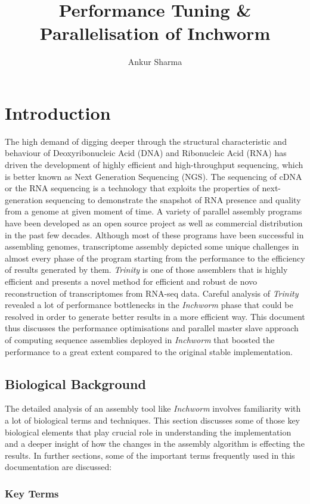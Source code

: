 \documentclass[plainarticle,zihtitle,english,final,hyperref,utf8]{zihpub}
\author{Ankur Sharma}
\title{Performance Tuning \& Parallelisation of Inchworm}
\begin{document}
\listoffigures
\newpage
\section{Introduction} 
The high demand of digging deeper through the structural characteristic and behaviour of Deoxyribonucleic Acid (DNA) and Ribonucleic Acid (RNA) has driven the development of highly efficient and high-throughput sequencing, which is better known as Next Generation Sequencing (NGS). The sequencing of cDNA or the RNA sequencing is a technology that exploits the properties of next-generation sequencing to demonstrate the snapshot of RNA presence and quality from a genome at given moment of time. A variety of parallel assembly programs have been developed as an open source project as well as commercial distribution in the past few decades. Although most of these programs have been successful in assembling genomes, transcriptome assembly depicted some unique challenges in almost every phase of the program starting from the performance to the efficiency of results generated by them. \emph{Trinity} is one of those assemblers that is highly efficient and presents a novel method for efficient and robust de novo reconstruction of transcriptomes from RNA-seq data. Careful analysis of \emph{Trinity} revealed a lot of performance bottlenecks in the \emph{Inchworm} phase that could be resolved in order to generate better results in a more efficient way. This document thus discusses the performance optimisations and parallel master slave approach of computing sequence assemblies deployed in \emph{Inchworm} that boosted the performance to a great extent compared to the original stable implementation.
\subsection{Biological Background}
The detailed analysis of  an assembly tool like \emph{Inchworm} involves familiarity with a lot of biological terms and techniques. This section discusses some of those key biological elements that play crucial role in understanding the implementation and a deeper insight of how the changes in the assembly algorithm is effecting the results. In further sections, some of the important terms frequently used in this documentation are discussed:
\subsubsection{Key Terms}
\end{document}
